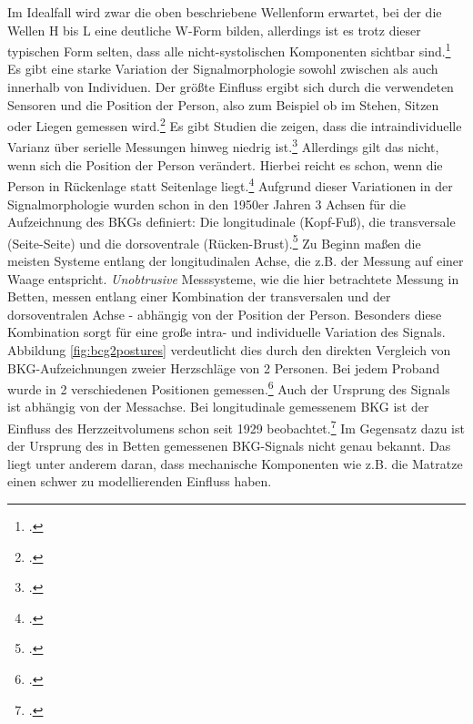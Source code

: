 	Im Idealfall wird zwar die oben beschriebene Wellenform erwartet, bei der die Wellen H bis L eine deutliche W-Form bilden, allerdings ist es trotz dieser typischen Form selten, dass alle nicht-systolischen Komponenten sichtbar sind.\footcite[Vgl.][]{Pinheiro2010} Es gibt eine starke Variation der Signalmorphologie sowohl zwischen als auch innerhalb von Individuen. Der größte Einfluss ergibt sich durch die verwendeten Sensoren und die Position der Person, also zum Beispiel ob im Stehen, Sitzen oder Liegen gemessen wird.\footcite[Vgl.][]{Sadek2019} Es gibt Studien die zeigen, dass die intraindividuelle Varianz über serielle Messungen hinweg niedrig ist.\footcite[Vgl.][]{Inan2015} Allerdings gilt das nicht, wenn sich die Position der Person verändert. Hierbei reicht es schon, wenn die Person in Rückenlage statt Seitenlage liegt.\footcite[Vgl.][]{Bruser2011} Aufgrund dieser Variationen in der Signalmorphologie wurden schon in den 1950er Jahren 3 Achsen für die Aufzeichnung des \ac{BKG}s definiert: Die longitudinale (Kopf-Fuß), die transversale (Seite-Seite) und die dorsoventrale (Rücken-Brust).\footcite[][Vgl.]{Bruser2011, Inan2015} Zu Beginn maßen die meisten Systeme entlang der longitudinalen Achse, die z.B. der Messung auf einer Waage entspricht. \textit{Unobtrusive} Messsysteme, wie die hier betrachtete Messung in Betten, messen entlang einer Kombination der transversalen und der dorsoventralen Achse - abhängig von der Position der Person. Besonders diese Kombination sorgt für eine große intra- und individuelle Variation des Signals. Abbildung \ref{fig:bcg2postures} verdeutlicht dies durch den direkten Vergleich von \ac{BKG}-Aufzeichnungen zweier Herzschläge von 2 Personen. Bei jedem Proband wurde in 2 verschiedenen Positionen gemessen.\footcite{Bruser2011} Auch der Ursprung des Signals ist abhängig von der Messachse. Bei longitudinale gemessenem \ac{BKG} ist der Einfluss des Herzzeitvolumens schon seit 1929 beobachtet.\footcite[Vgl.][]{Starr1939} Im Gegensatz dazu ist der Ursprung des in Betten gemessenen \ac{BKG}-Signals nicht genau bekannt. Das liegt unter anderem daran, dass mechanische Komponenten wie z.B. die Matratze einen schwer zu modellierenden Einfluss haben.
	
